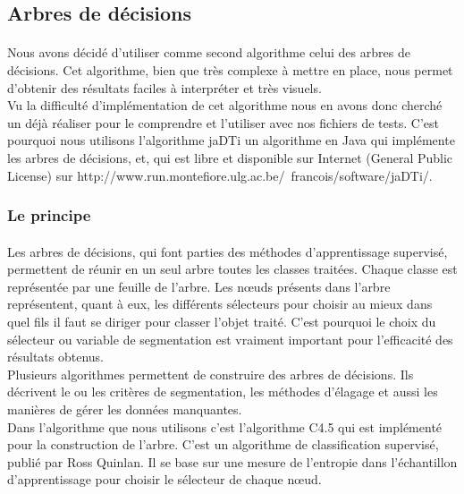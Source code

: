 \subsection{Arbres de décisions}

\paragraph{}
Nous avons décidé d'utiliser comme second algorithme celui des arbres de décisions. Cet algorithme, bien que très complexe à mettre en place, nous permet d'obtenir des résultats faciles à interpréter et très visuels.\\
Vu la difficulté d'implémentation de cet algorithme nous en avons donc cherché un déjà réaliser pour le comprendre et l'utiliser avec nos fichiers de tests. C'est pourquoi nous utilisons l'algorithme jaDTi un algorithme en Java qui implémente les arbres de décisions, et, qui est libre et disponible sur Internet (General Public License) sur http://www.run.montefiore.ulg.ac.be/~francois/software/jaDTi/.


\subsubsection{Le principe}

\paragraph{}
Les arbres de décisions, qui font parties des méthodes d'apprentissage supervisé,  permettent  de réunir en un seul arbre toutes les classes traitées. Chaque classe est représentée par une feuille de l'arbre. Les nœuds présents dans l'arbre représentent, quant à eux, les différents sélecteurs pour choisir au mieux dans quel fils il faut se diriger pour classer l'objet traité. C'est pourquoi le choix du sélecteur ou variable de segmentation est vraiment important pour l'efficacité des résultats obtenus.\\
Plusieurs algorithmes permettent de construire des arbres de décisions. Ils  décrivent le ou les critères de segmentation, les méthodes d'élagage et aussi  les manières de gérer les données manquantes.\\
Dans l'algorithme que nous utilisons c'est l'algorithme C4.5 qui est implémenté pour la construction de l'arbre. C'est un algorithme de classification supervisé, publié par Ross Quinlan. Il se base sur une mesure de l'entropie dans l'échantillon d'apprentissage pour choisir le sélecteur de chaque nœud.

